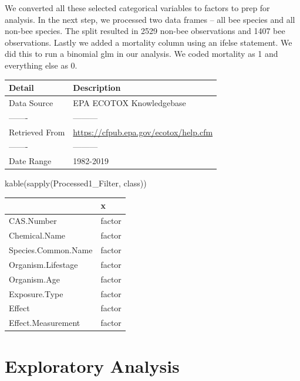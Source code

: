 \documentclass[
  12pt,
]{article}
\newenvironment{Shaded}{\begin{snugshade}}{\end{snugshade}}
\newcommand{\FunctionTok}[1]{\textcolor[rgb]{0.00,0.00,0.00}{#1}}
\newcommand{\NormalTok}[1]{#1}
\begin{document}
We converted all these selected categorical variables to factors to prep
for analysis. In the next step, we processed two data frames -- all bee
species and all non-bee species. The split resulted in 2529 non-bee
observations and 1407 bee observations. Lastly we added a mortality
column using an ifelse statement. We did this to run a binomial glm in
our analysis. We coded mortality as 1 and everything else as 0.

\begin{longtable}[]{@{}ll@{}}
\toprule
Detail & Description \\
\midrule
\endhead
Data Source & EPA ECOTOX Knowledgebase \\
------- & --------- \\
Retrieved From & \url{https://cfpub.epa.gov/ecotox/help.cfm} \\
------- & --------- \\
Date Range & 1982-2019 \\
\bottomrule
\end{longtable}

\begin{Shaded}
\begin{Highlighting}[]
\FunctionTok{kable}\NormalTok{(}\FunctionTok{sapply}\NormalTok{(Processed1\_Filter, class))}
\end{Highlighting}
\end{Shaded}

\begin{longtable}[]{@{}ll@{}}
\toprule
& x \\
\midrule
\endhead
CAS.Number & factor \\
Chemical.Name & factor \\
Species.Common.Name & factor \\
Organism.Lifestage & factor \\
Organism.Age & factor \\
Exposure.Type & factor \\
Effect & factor \\
Effect.Measurement & factor \\
\bottomrule
\end{longtable}

\newpage

\hypertarget{exploratory-analysis}{%
\section{Exploratory Analysis}\label{exploratory-analysis}}
\end{document}
